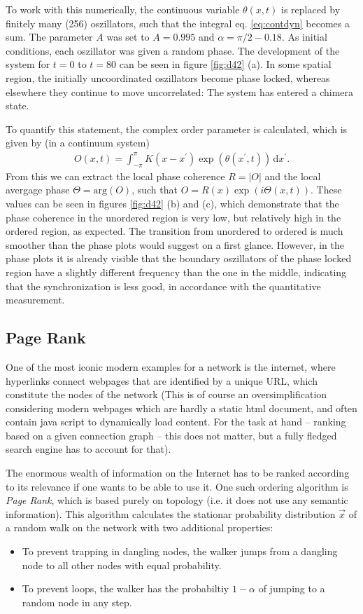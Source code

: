 \documentclass{scrartcl}
\begin{document}
To work with this numerically, the continuous variable $\theta(x, t)$ is replaced by finitely many (256) oszillators, such that the integral eq. \ref{eq:contdyn} becomes a sum. The parameter $A$ was set to $A= 0.995$ and $\alpha = \pi/2 - 0.18$. As initial conditions, each oszillator was given a random phase. 
The development of the system for $t=0$ to $t=80$ can be seen in figure \ref{fig:d42} (a).
In some spatial region, the initially uncoordinated oszillators become phase locked, whereas elsewhere they continue to move uncorrelated: The system has entered a chimera state.

To quantify this statement, the complex order parameter is calculated, which is given by (in a continuum system)
\begin{align}
 O(x, t) = \int_{-\pi}^{\pi} K(x-x^\prime) \exp( \theta(x^\prime, t)) \, \mathrm{d} x^\prime. \label{eq:orderparameter}
\end{align} 
From this we can extract the local phase coherence $R = |O|$ and the local avergage phase $\Theta = \mathrm{arg}(O)$, such that
$O = R(x) \exp( i \Theta(x, t) )$. 
These values can be seen in figures \ref{fig:d42} (b) and (c), which demonstrate that the phase coherence in the unordered region is very low, but relatively high in the ordered region, as expected. 
The transition from unordered to ordered is much smoother than the phase plots would suggest on a first glance.
However, in the phase plots it is already visible that the boundary oszillators of the phase locked region have a slightly different frequency than the one in the middle, indicating that the synchronization is less good, in accordance with the quantitative measurement.

\subsection{Page Rank}
One of the most iconic modern examples for a network is the internet, 
where hyperlinks connect webpages that are identified 
by a unique URL, which constitute the nodes of the network (This is of course
an oversimplification considering modern webpages which are hardly a static 
html document, and often contain java script to dynamically load content. For
the task at hand -- ranking based on a given connection graph -- this does not
matter, but a fully fledged search engine has to account for that).

The enormous wealth of information on the Internet has to be ranked according
to its relevance if one wants to be able to use it. One such ordering algorithm 
is \emph{Page Rank}, which is based purely on topology (i.e. it does not use 
any semantic information). This algorithm calculates the stationar probability 
distribution $\vec{x}$ of a random walk on the network with two additional properties:
\begin{itemize}
 \item To prevent trapping in dangling nodes, the walker jumps from a dangling node
		to all other nodes with equal probability.
 \item To prevent loops, the walker has the probabiltiy $1-\alpha$ of jumping to a random	
	node in any step.
\end{itemize}
\end{document}
